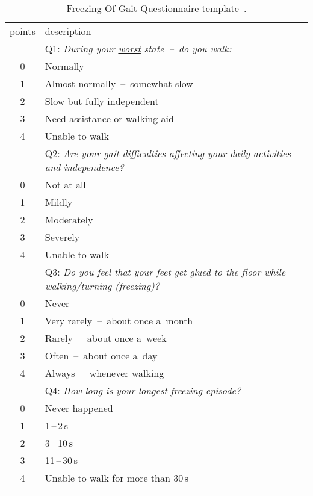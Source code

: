 \begin{table}[htb!]
	\centering
	\begin{threeparttable}
		\caption{Freezing Of Gait Questionnaire template~\cite{Giladi2000}.}
		\label{tab:FOGQ_template}
		\footnotesize
		\centering
		
		\begin{tabularx}{1.00\textwidth}{c X}
			\hline\hline\noalign{\smallskip}
			points & description \\
			\noalign{\smallskip}\hline

				& Q1: \textit{During your \underline{worst} state~--~do you walk:} \\
			0 & Normally \\
			1 & Almost normally~--~somewhat slow \\
			2 & Slow but fully independent \\
			3 & Need assistance or walking aid \\
			4 & Unable to walk \\
			\noalign{\smallskip}\hline

				& Q2: \textit{Are your gait difficulties affecting your daily activities and independence?} \\
			0 & Not at all \\
			1 & Mildly \\
			2 & Moderately \\
			3 & Severely \\
			4 & Unable to walk \\
			\noalign{\smallskip}\hline

				& Q3: \textit{Do you feel that your feet get glued to the floor while walking/turning (freezing)?} \\
			0 & Never \\
			1 & Very rarely~--~about once a~month \\
			2 & Rarely~--~about once a~week \\
			3 & Often~--~about once a~day \\
			4 & Always~--~whenever walking \\
			\noalign{\smallskip}\hline
			
				& Q4: \textit{How long is your \underline{longest} freezing episode?} \\
			0 & Never happened \\
			1 & 1\,--\,2\,s \\
			2 & 3\,--\,10\,s \\
			3 & 11\,--\,30\,s \\
			4 & Unable to walk for more than 30\,s \\
			\noalign{\smallskip}\hline


\end{tabularx}
\end{threeparttable}
\end{table}
